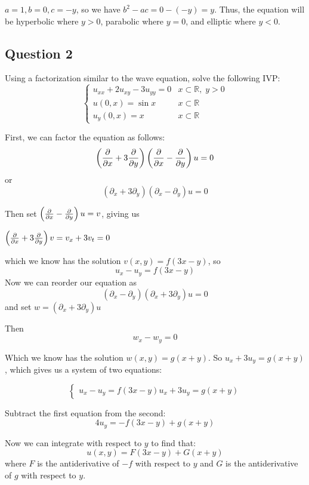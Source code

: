 \documentclass[
]{article}
\begin{document}
\(a=1, b=0, c=-y\), so we have \(b^2-ac=0-(-y)=y\). Thus, the equation
will be hyperbolic where \(y>0\), parabolic where \(y=0\), and elliptic
where \(y<0\).

\hypertarget{question-2}{%
\subsection{Question 2}\label{question-2}}

Using a factorization similar to the wave equation, solve the following
IVP: \begin{equation}
    \begin{cases}
      u_{xx}+2u_{xy}-3u_{yy}=0 & x\subset \mathbb{R},\; y> 0\\
      u(0,x)=\sin{x} & x\subset \mathbb{R}\\
      u_y(0,x) = x & x\subset \mathbb{R}
    \end{cases}       
\end{equation}

First, we can factor the equation as follows:
\[\left( \pdv{}{x}+3\pdv{}{y}\right) \left(\pdv{}{x}-\pdv{}{y}\right)u=0\]
or
\[\left( \partial_{x}+3\partial_{y}\right) \left(\partial_{x}-\partial_{y}\right)u=0\]

Then set \(\left(\pdv{}{x}-\pdv{}{y}\right)u=v\), giving us

\(\left( \pdv{}{x}+3\pdv{}{y}\right)v= v_x+3v_t=0\)

which we know has the solution \(v(x,y)=f(3x-y)\), so
\[u_x-u_y=f(3x-y)\] Now we can reorder our equation as
\[\left(\partial_{x}-\partial_{y}\right)
\left( \partial_{x}+3\partial_{y}\right)u=0\] and set
\(w=\left( \partial_{x}+3\partial_{y}\right)u\)

Then \[w_x-w_y=0 \]

Which we know has the solution \(w(x,y)=g(x+y)\). So
\(u_x+3u_y=g(x+y)\), which gives us a system of two equations:

\begin{equation}
\begin{cases}
u_x-u_y=f(3x-y)
u_x+3u_y=g(x+y)
\end{cases}
\end{equation}

Subtract the first equation from the second: \[4u_y=-f(3x-y)+g(x+y) \]

Now we can integrate with respect to \(y\) to find that:
\[u(x,y)=F(3x-y)+G(x+y)\] where \(F\) is the antiderivative of \(-f\)
with respect to \(y\) and \(G\) is the antiderivative of \(g\) with
respect to \(y\).
\end{document}
